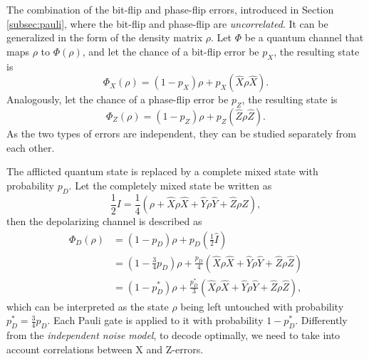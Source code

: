 \begin{definition}\label{def:independent}
  The combination of the bit-flip and phase-flip errors, introduced in Section \ref{subsec:pauli}, where the bit-flip and phase-flip are \emph{uncorrelated}. It can be generalized in the form of the density matrix $\rho$. Let $\Phi$ be a quantum channel that maps $\rho$ to $\Phi(\rho)$, and let the chance of a bit-flip error be $p_X$, the resulting state is
  \begin{equation}\label{qec:eq:bitflip}
    \Phi_X(\rho) = (1-p_X)\rho + p_X(\hat{X}\rho \hat{X}).
  \end{equation}
  Analogously, let the chance of a phase-flip error be $p_Z$, the resulting state is
  \begin{equation}\label{qec:eq:phaseflip}
    \Phi_Z(\rho) = (1-p_Z)\rho + p_Z(\hat{Z}\rho \hat{Z}).
  \end{equation}
  As the two types of errors are independent, they can be studied separately from each other.
\end{definition}

\begin{definition}\label{def:depolarizing}
  The afflicted quantum state is replaced by a complete mixed state with probability $p_D$. Let the completely mixed state be written as
  \begin{equation}\label{qec:eq:mixstate}
    \frac{1}{2}I = \frac{1}{4}(\rho + \hat{X}\rho \hat{X} + \hat{Y}\rho \hat{Y} + \hat{Z}\rho \hat{Z}),
  \end{equation}
  then the depolarizing channel is described as
  \begin{align}\label{qec:eq:depolarizing}
    \nonumber \Phi_D(\rho) &= (1-p_D)\rho + p_D\left(\frac{1}{2}\hat{I}\right) \\
    \nonumber &= \left(1-\frac{3}{4}p_D\right)\rho + \frac{p_D}{4}(\hat{X}\rho \hat{X} + \hat{Y}\rho \hat{Y} + \hat{Z}\rho \hat{Z}) \\
    &= (1-p^*_D)\rho + \frac{p^*_D}{3}(\hat{X}\rho \hat{X} + \hat{Y}\rho \hat{Y} + \hat{Z}\rho \hat{Z}),
  \end{align}
  which can be interpreted as the state $\rho$ being left untouched with probability $p^*_D =\frac{3}{4}p_D$. Each Pauli gate is applied to it with probability $1-p^*_D$. Differently from the \emph{independent noise model}, to decode optimally, we need to take into account correlations between X and Z-errors.
\end{definition}

